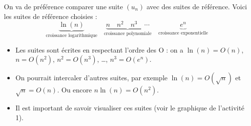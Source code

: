 \documentclass[11pt,class=report,crop=false]{standalone}
\begin{document}
\begin{cours}
On va de préférence comparer une suite $(u_n)$ avec des suites de référence. Voici les suites de référence choisies :
$$\underbrace{\ln(n)}_{\text{croissance logarithmique}} \quad \underbrace{n \quad  n^2 \quad n^3 \quad  \cdots}_{\text{croissance polynomiale}} \quad \underbrace{e^n}_{\text{croissance exponentielle}}$$

\begin{itemize}
	\item Les suites sont écrites en respectant l'ordre des O : on a $\ln(n) = O(n)$, $n=O(n^2)$, $n^2=O(n^3)$, \ldots, $n^3 = O(e^n)$.
	
	\item On pourrait intercaler d'autres suites, par exemple $\ln(n) = O(\sqrt{n})$ et $\sqrt{n} = O(n)$.
	Ou encore $n\ln(n) = O(n^2)$.
	
	\item Il est important de savoir visualiser ces suites (voir le graphique de l'activité 1).
\end{itemize}

\end{cours}


\end{document}
